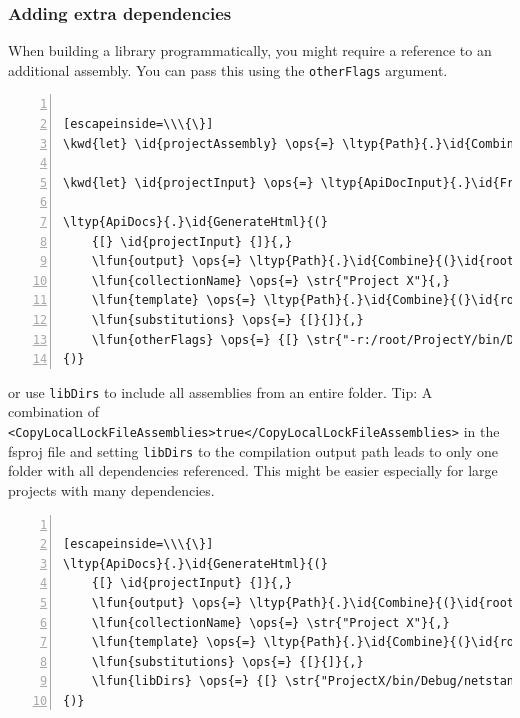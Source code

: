 \documentclass{article}
\newcommand{\id}[1]{\textcolor{black}{#1}}
\newcommand{\kwd}[1]{\textcolor{navy}{#1}}
\newcommand{\ops}[1]{\textcolor{purple}{#1}}
\newcommand{\str}[1]{\textcolor{olive}{#1}}
\begin{document}
\subsubsection*{Adding extra dependencies}



When building a library programmatically, you might require a reference to an additional assembly.
You can pass this using the \texttt{otherFlags} argument.
\begin{lstlisting}[numbers=left]

[escapeinside=\\\{\}]
\kwd{let} \id{projectAssembly} \ops{=} \ltyp{Path}{.}\id{Combine}{(}\id{root}{,} \str{"bin/X.dll"}{)}

\kwd{let} \id{projectInput} \ops{=} \ltyp{ApiDocInput}{.}\id{FromFile}{(}\id{projectAssembly}{)}

\ltyp{ApiDocs}{.}\id{GenerateHtml}{(}
    {[} \id{projectInput} {]}{,}
    \lfun{output} \ops{=} \ltyp{Path}{.}\id{Combine}{(}\id{root}{,} \str{"output"}{)}{,}
    \lfun{collectionName} \ops{=} \str{"Project X"}{,}
    \lfun{template} \ops{=} \ltyp{Path}{.}\id{Combine}{(}\id{root}{,} \str{"templates"}{,} \str{"template.html"}{)}{,}
    \lfun{substitutions} \ops{=} {[}{]}{,}
    \lfun{otherFlags} \ops{=} {[} \str{"-r:/root/ProjectY/bin/Debug/net6.0/Y.dll"} {]}
{)}

\end{lstlisting}



or use \texttt{libDirs} to include all assemblies from an entire folder.
Tip: A combination of \texttt{<CopyLocalLockFileAssemblies>true</CopyLocalLockFileAssemblies>} in the fsproj file and setting \texttt{libDirs} to the compilation output path leads to only one folder with all dependencies referenced.
This might be easier especially for large projects with many dependencies.
\begin{lstlisting}[numbers=left]

[escapeinside=\\\{\}]
\ltyp{ApiDocs}{.}\id{GenerateHtml}{(}
    {[} \id{projectInput} {]}{,}
    \lfun{output} \ops{=} \ltyp{Path}{.}\id{Combine}{(}\id{root}{,} \str{"output"}{)}{,}
    \lfun{collectionName} \ops{=} \str{"Project X"}{,}
    \lfun{template} \ops{=} \ltyp{Path}{.}\id{Combine}{(}\id{root}{,} \str{"templates"}{,} \str{"template.html"}{)}{,}
    \lfun{substitutions} \ops{=} {[}{]}{,}
    \lfun{libDirs} \ops{=} {[} \str{"ProjectX/bin/Debug/netstandard2.0"} {]}
{)}

\end{lstlisting}
\end{document}
